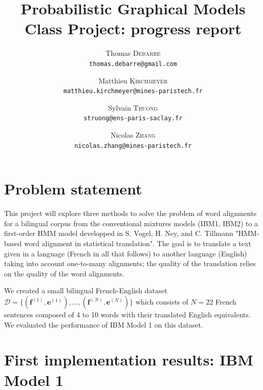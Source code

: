 \documentclass[10pt]{article}
\begin{document}
\author{
  Thomas \textsc{Debarre}\\
  \texttt{thomas.debarre@gmail.com}
  \and
  Matthieu \textsc{Kirchmeyer}\\
  \texttt{matthieu.kirchmeyer@mines-paristech.fr}
  \and
  Sylvain \textsc{Truong}\\
  \texttt{struong@ens-paris-saclay.fr}
  \and
  Nicolas \textsc{Zhang}\\
  \texttt{nicolas.zhang@mines-paristech.fr}
}
\title{Probabilistic Graphical Models \\ Class Project: progress report}
\maketitle

\section{Problem statement}
This project will explore three methods to solve the problem of word alignments for a bilingual corpus from the conventional mixtures models (IBM1, IBM2) to a first-order HMM model developped in S. Vogel, H. Ney, and C. Tillmann "HMM-based word alignment in statistical translation". The goal is to translate a text given in a language (French in all that follows) to another language (English) taking into account one-to-many alignments; the quality of the translation relies on the quality of the word alignments.

We created a small bilingual French-English dataset $\mathcal{D} = \{ (\mathbf{f}^{(1)},\mathbf{e}^{(1)}), \dots , (\mathbf{f}^{(N)},\mathbf{e}^{(N)})\}$ which consists of $N = 22$ French sentences composed of 4 to 10 words with their translated English equivalents. We evaluated the performance of IBM Model 1 on this dataset. 

\section{First implementation results: IBM Model 1}
\end{document}

